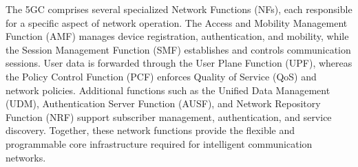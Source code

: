 \documentclass[12pt,a4paper]{report}
\begin{document}
	The 5GC comprises several specialized Network Functions (NFs), each responsible for a specific aspect of network operation. The Access and Mobility Management Function (AMF) manages device registration, authentication, and mobility, while the Session Management Function (SMF) establishes and controls communication sessions. User data is forwarded through the User Plane Function (UPF), whereas the Policy Control Function (PCF) enforces Quality of Service (QoS) and network policies. Additional functions such as the Unified Data Management (UDM), Authentication Server Function (AUSF), and Network Repository Function (NRF) support subscriber management, authentication, and service discovery. Together, these network functions provide the flexible and programmable core infrastructure required for intelligent communication networks.
	
	
	
\end{document}
